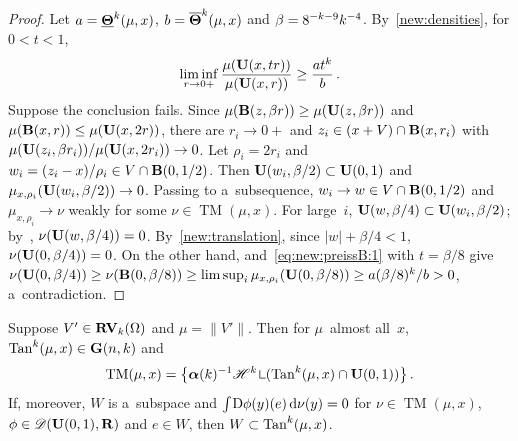 \documentclass[a4paper,twoside,leqno]{article}
\DeclareMathOperator{\TM}{TM}                   %
\begin{document}
\begin{proof}
    Let $a = \boldsymbol{\underline{\Theta}}^{k}(\mu,x)$, $b = \boldsymbol{\overline{\Theta}}^{k}(\mu,x)$ and $\beta = 8^{-k-9}
    k^{-4}$. By~\ref{new:densities}, for $0 < t < 1$,
    \begin{equation}
        \label{eq:new:preissB:1}
        \liminf_{r \to 0+} \frac{\mu(\mathbf{U}(x,tr))}{\mu(\mathbf{U}(x,r))} \ge \frac{a t^{k}}{b} \,.
    \end{equation}
    Suppose the conclusion fails. Since $\mu(\mathbf{B}(z,\beta r)) \ge \mu(\mathbf{U}(z,\beta r))$ and
    $\mu(\mathbf{B}(x,r)) \le \mu(\mathbf{U}(x,2r))$, there are $r_i \to 0+$ and $z_i \in (x + V) \cap
    \mathbf{B}(x,r_i)$ with $\mu(\mathbf{U}(z_i,\beta r_i)) / \mu(\mathbf{U}(x,2r_i)) \to 0$. Let $\rho_i =
    2r_i$ and $w_i = (z_i - x)/\rho_i \in V \cap \mathbf{B}(0,1/2)$. Then $\mathbf{U}(w_i,\beta/2)
    \subset \mathbf{U}(0,1)$ and $\mu_{x,\rho_i}(\mathbf{U}(w_i,\beta/2)) \to 0$. Passing to
    a~subsequence, $w_i \to w \in V \cap \mathbf{B}(0,1/2)$ and $\mu_{x,\rho_i} \to \nu$ weakly for
    some $\nu \in \TM(\mu,x)$. For large~$i$, $\mathbf{U}(w,\beta/4) \subset \mathbf{U}(w_i,\beta/2)$;
    by~\cite[2.6(2)(c)]{Allard1972}, $\nu(\mathbf{U}(w,\beta/4)) = 0$. By~\ref{new:translation}, since
    $|w| + \beta/4 < 1$, $\nu(\mathbf{U}(0,\beta/4)) = 0$. On the other hand,
    \cite[2.6(2)(c)]{Allard1972} and~\eqref{eq:new:preissB:1} with $t = \beta/8$ give
    $\nu(\mathbf{U}(0,\beta/4)) \ge \nu(\mathbf{B}(0,\beta/8)) \ge \limsup_i
    \mu_{x,\rho_i}(\mathbf{U}(0,\beta/8)) \ge a (\beta/8)^{k} / b > 0$, a~contradiction.
\end{proof}

\begin{lemma}[new]
    \label{new:flat}
    Suppose $V' \in \mathbf{RV}_{k}(\Omega)$ and $\mu = \|V'\|$. Then for $\mu$~almost all~$x$,
    $\operatorname{Tan}^{k}(\mu,x) \in \mathbf{G}(n,k)$ and
    \begin{displaymath}
        \TM(\mu,x) = \bigl\{ \unitmeasure{\vdim}^{-1} \HM^{\vdim} \restrict (\Tan^{\vdim}(\mu,x) \cap
        \oball{0}{1}) \bigr\} \,.
    \end{displaymath}
    If, moreover, $W$ is a~subspace and ${\textstyle\int_{}^{}} \mathrm{D} \phi(y)(e) \,\mathrm{d} \nu(y) = 0$ for $\nu \in
    \TM(\mu,x)$, $\phi \in \mathscr{D}(\mathbf{U}(0,1),\mathbf{R})$ and $e \in W$, then $W \subset
    \operatorname{Tan}^{k}(\mu,x)$.
\end{lemma}
\end{document}
